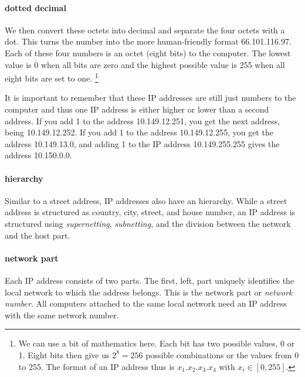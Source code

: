 \paragraph{dotted decimal}
We then convert these octets into decimal and separate the four octets with a dot.
This turns the number  into the more human-friendly format 66.101.116.97.
Each of these four numbers is an octet (eight bits) to the computer.
The lowest value is 0 when all bits are zero and the highest possible value is 255 when all eight bits are set to one.%
   \footnote{%
      We can use a bit of mathematics here.
      Each bit has two possible values, 0 or 1.
      Eight bits then give us $2^8 = 256$ possible combinations or the values from 0 to 255.
      The format of an \acs{IP} address thus is $x_1.x_2.x_3.x_4$ with $x_i \in [0,255]$.
   }

It is important to remember that these \acs{IP} addresses are still just numbers to the computer and thus one \acs{IP} address is either higher or lower than a second address.
If you add 1 to the address 10.149.12.251, you get the next address, being 10.149.12.252.
If you add 1 to the address 10.149.12.255, you get the address 10.149.13.0, and adding 1 to the \acs{IP} address 10.149.255.255 gives the address 10.150.0.0.

\paragraph{hierarchy}
Similar to a street address, \acs{IP} addresses also have an hierarchy.
While a street address is structured as country, city, street, and house number, an \acs{IP} address is structured using \emph{supernetting}, \emph{subnetting}, and the division between the network and the host part.

\paragraph{network part}
Each \acs{IP} address consists of two parts.
The first, left, part uniquely identifies the local network to which the address belongs.
This is the network part or \emph{network number}.%
All computers attached to the same local network need an \acs{IP} address with the same network number.

